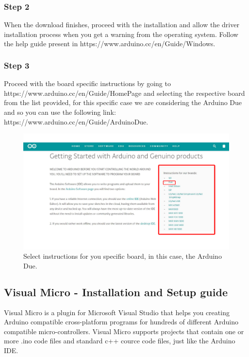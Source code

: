 \begin{refsection}
\subsubsection{Step 2}

When the download finishes, proceed with the installation and allow the driver installation process when you get a warning from the operating system. Follow the help guide present in https://www.arduino.cc/en/Guide/Windows.

\subsubsection{Step 3}

Proceed with the board specific instructions by going to https://www.arduino.cc/en/Guide/HomePage and selecting the respective board from the list provided, for this specific case we are considering the Arduino Due and so you can use the following link: https://www.arduino.cc/en/Guide/ArduinoDue.

\begin{figure}[H]
	\centering
	\includegraphics[width=1\linewidth]{./sdf/arduino_quantum_rx/figures/arduinoBoards.pdf}
	\caption{Select instructions for you specific board, in this case, the Arduino Due.}
	\label{arduinoDownload}
\end{figure}

\subsection{Visual Micro - Installation and Setup guide}
Visual Micro is a plugin for Microsoft Visual Studio that helps you creating Arduino compatible cross-platform programs for hundreds of different Arduino compatible micro-controllers. Visual Micro supports projects that contain one or more .ino code files and standard c++ cource code files, just like the Arduino IDE. 



\end{refsection}
